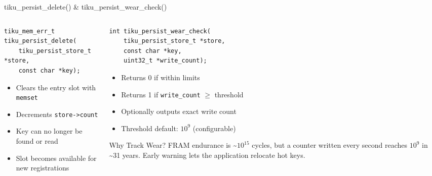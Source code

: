 \documentclass[aspectratio=169, 10pt]{beamer}
\begin{document}
\begin{frame}[fragile]{tiku\_persist\_delete() \& tiku\_persist\_wear\_check()}
\begin{columns}[T]
\begin{column}{0.48\textwidth}
\begin{lstlisting}[style=cstyle, title={Delete an entry}]
tiku_mem_err_t tiku_persist_delete(
    tiku_persist_store_t *store,
    const char *key);
\end{lstlisting}

\begin{itemize}
  \item Clears the entry slot with \texttt{memset}
  \item Decrements \texttt{store->count}
  \item Key can no longer be found or read
  \item Slot becomes available for new registrations
\end{itemize}
\end{column}

\begin{column}{0.48\textwidth}
\begin{lstlisting}[style=cstyle, title={Check wear level}]
int tiku_persist_wear_check(
    tiku_persist_store_t *store,
    const char *key,
    uint32_t *write_count);
\end{lstlisting}

\begin{itemize}
  \item Returns 0 if within limits
  \item Returns 1 if \texttt{write\_count} $\geq$ threshold
  \item Optionally outputs exact write count
  \item Threshold default: $10^9$ (configurable)
\end{itemize}

\vspace{0.3em}
\begin{alertblock}{Why Track Wear?}
FRAM endurance is \textasciitilde$10^{15}$ cycles, but a counter
written every second reaches $10^9$ in \textasciitilde31 years.
Early warning lets the application relocate hot keys.
\end{alertblock}
\end{column}
\end{columns}
\end{frame}
\end{document}
